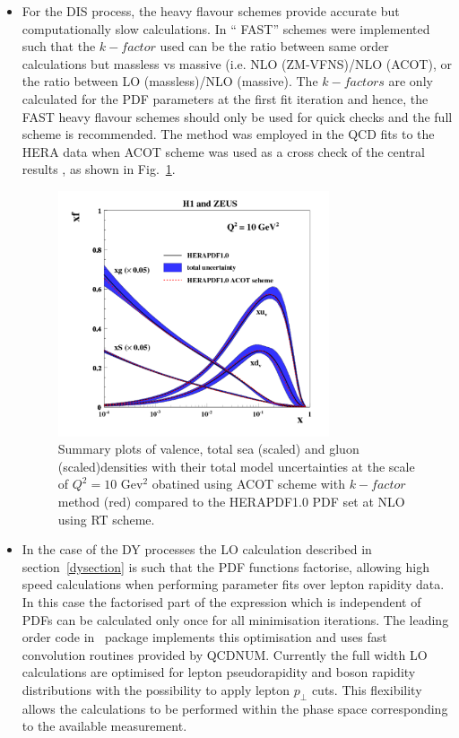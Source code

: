 \begin{description}
\begin{itemize}
\item For the DIS process, the heavy flavour schemes provide accurate but computationally slow calculations. In \fitter `` FAST'' schemes were implemented 
such that the $k-factor$ used can be
the ratio between same order calculations but massless vs massive 
(i.e. NLO (ZM-VFNS)/NLO (ACOT), or 
the ratio between LO (massless)/NLO (massive).
The $k-factors$ are only calculated for the PDF parameters at the first 
fit iteration
 and hence, the FAST heavy flavour schemes should only be used 
for quick checks and the full scheme is recommended.
The method was employed in the QCD fits to the HERA data when ACOT scheme was used as a cross check of the central results \cite{h1zeus:2009}, as shown in Fig.~\ref{fig:acotrt}.
\begin{figure}[!ht]
   \centering
   \includegraphics[width=8cm]{heraacot.pdf}
   \caption{Summary plots of valence, total sea (scaled) and gluon (scaled)densities with their total model uncertainties at the scale of $Q^2=10$ Gev$^2$ obatined using ACOT scheme with $k-factor$ method (red) compared to the HERAPDF1.0 PDF set at NLO using RT scheme.}
 \label{fig:acotrt}
\end{figure}



\item 
In the case of the DY processes the LO calculation described in section~\ref{dysection}
is such that the PDF functions factorise, allowing high speed calculations when 
performing parameter fits over lepton rapidity data. In this case
the factorised part of the expression which is independent of PDFs can be
calculated only once for all minimisation iterations.
The leading order code in \fitter\ package implements this 
optimisation and uses fast convolution routines provided by
QCDNUM. Currently the full width LO calculations are optimised 
for lepton pseudorapidity and boson rapidity distributions with the
possibility to apply lepton \(p_{\perp}\) cuts.
This flexibility allows the calculations to be performed within the phase space
corresponding to the available measurement.


\end{itemize}
\end{description}
